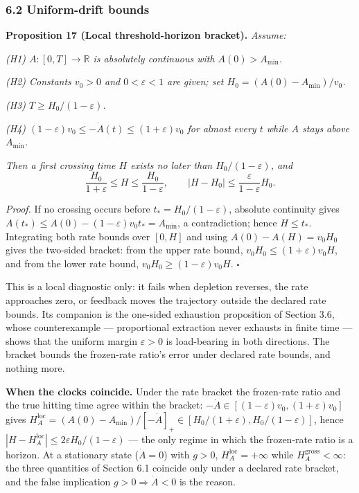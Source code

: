 \documentclass[11pt]{article}
\begin{document}
\subsubsection{6.2 Uniform-drift bounds}\label{uniform-drift-bounds}

\textbf{Proposition 17 (Local threshold-horizon bracket).}
\emph{Assume:}

\emph{(H1) \(A : [0,T] \to \mathbb{R}\) is absolutely continuous with
\(A(0) > A_{\min}\).}

\emph{(H2) Constants \(v_0 > 0\) and \(0 < \varepsilon < 1\) are given;
set \(H_0 = (A(0) - A_{\min})/v_0\).}

\emph{(H3) \(T \ge H_0/(1-\varepsilon)\).}

\emph{(H4) \((1-\varepsilon)v_0 \le -\dot A(t) \le (1+\varepsilon)v_0\)
for almost every \(t\) while \(A\) stays above \(A_{\min}\).}

\emph{Then a first crossing time \(H\) exists no later than
\(H_0/(1-\varepsilon)\), and}
\[\frac{H_0}{1+\varepsilon} \le H \le \frac{H_0}{1-\varepsilon}, \qquad |H - H_0| \le \frac{\varepsilon}{1-\varepsilon}H_0.\]

\emph{Proof.} If no crossing occurs before
\(t_* = H_0/(1-\varepsilon)\), absolute continuity gives
\(A(t_*) \le A(0) - (1-\varepsilon)v_0 t_* = A_{\min}\), a
contradiction; hence \(H \le t_*\). Integrating both rate bounds over
\([0,H]\) and using \(A(0) - A(H) = v_0 H_0\) gives the two-sided
bracket: from the upper rate bound,
\(v_0 H_0 \le (1+\varepsilon) v_0 H\), and from the lower rate bound,
\(v_0 H_0 \ge (1-\varepsilon) v_0 H\). \ensuremath{\square}

This is a local diagnostic only: it fails when depletion reverses, the
rate approaches zero, or feedback moves the trajectory outside the
declared rate bounds. Its companion is the one-sided exhaustion
proposition of Section 3.6, whose counterexample --- proportional
extraction never exhausts in finite time --- shows that the uniform
margin \(\varepsilon > 0\) is load-bearing in both directions. The
bracket bounds the frozen-rate ratio's error under declared rate bounds,
and nothing more.

\textbf{When the clocks coincide.} Under the rate bracket the
frozen-rate ratio and the true hitting time agree within the bracket:
\(-\dot A \in [(1-\varepsilon)v_0, (1+\varepsilon)v_0]\) gives
\(H_A^{\mathrm{loc}} = (A(0) - A_{\min})/[-\dot A]_+ \in [H_0/(1+\varepsilon), H_0/(1-\varepsilon)]\),
hence \(|H - H_A^{\mathrm{loc}}| \le 2\varepsilon H_0/(1-\varepsilon)\)
--- the only regime in which the frozen-rate ratio is a horizon. At a
stationary state (\(\dot A = 0\)) with \(g > 0\),
\(H_A^{\mathrm{loc}} = +\infty\) while
\(H_A^{\mathrm{gross}} < \infty\): the three quantities of Section 6.1
coincide only under a declared rate bracket, and the false implication
\(g > 0 \Rightarrow \dot A < 0\) is the reason.
\end{document}
